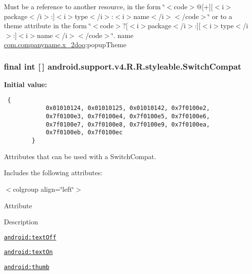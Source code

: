 Must be a reference to another resource, in the form \char`\"{}$<$code$>$@\mbox{[}+\mbox{]}\mbox{[}$<$i$>$package$<$/i$>$:\mbox{]}$<$i$>$type$<$/i$>$:$<$i$>$name$<$/i$>$$<$/code$>$\char`\"{} or to a theme attribute in the form \char`\"{}$<$code$>$?\mbox{[}$<$i$>$package$<$/i$>$:\mbox{]}\mbox{[}$<$i$>$type$<$/i$>$:\mbox{]}$<$i$>$name$<$/i$>$$<$/code$>$\char`\"{}.  name \hyperlink{namespacecom_1_1companyname_1_1x__2doo}{com.companyname.x\_\-2doo}:popupTheme \hypertarget{classandroid_1_1support_1_1v4_1_1_r_1_1styleable_276d9c1ec80821a3e0fcdaa41daa75a0}{
\subsubsection[{SwitchCompat}]{\setlength{\rightskip}{0pt plus 5cm}final int \mbox{[}$\,$\mbox{]} android.support.v4.R.R.styleable.SwitchCompat}}
\label{classandroid_1_1support_1_1v4_1_1_r_1_1styleable_276d9c1ec80821a3e0fcdaa41daa75a0}


\textbf{Initial value:}

\begin{Code}\begin{verbatim} {
            0x01010124, 0x01010125, 0x01010142, 0x7f0100e2,
            0x7f0100e3, 0x7f0100e4, 0x7f0100e5, 0x7f0100e6,
            0x7f0100e7, 0x7f0100e8, 0x7f0100e9, 0x7f0100ea,
            0x7f0100eb, 0x7f0100ec
        }
\end{verbatim}
\end{Code}
Attributes that can be used with a SwitchCompat. 

Includes the following attributes: \begin{TabularC}{0}
\hline
\end{TabularC}
$<$colgroup align=\char`\"{}left\char`\"{}$>$ 

Attribute

Description 

{\tt \hyperlink{classandroid_1_1support_1_1v4_1_1_r_1_1styleable_475ea27dd698f2f7fb83ff65423189c3}{android:textOff}}

{\tt \hyperlink{classandroid_1_1support_1_1v4_1_1_r_1_1styleable_8198d90992e4ff6dfd99cdd17ff4deef}{android:textOn}}

{\tt \hyperlink{classandroid_1_1support_1_1v4_1_1_r_1_1styleable_2499279c732b44c04537677dfc6988b4}{android:thumb}}

